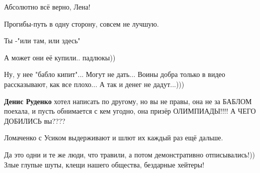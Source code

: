 \begin{itemize}
Абсолютно всё верно, Лена!

Прогибы-путь в одну сторону, совсем не лучшую.

Ты -"или там, или здесь"

 
А может они её купили.. падлюкы))

 
Ну, у нее "бабло кипит"... Могут не дать... Воины добра только в видео
рассказывают, как все плохо... А так и денег не дадут...)))

\begin{itemize}
 
\textbf{Денис Руденко} хотел написать по другому, но вы не правы, она не за БАБЛОМ поехала, и пусть обнимается с кем угодно, она призёр ОЛИМПИАДЫ!!!! А ЧЕГО ДОБИЛИСЬ вы????
\end{itemize}

 
Ломаченко с Усиком выдерживают и шлют их каждый раз ещё дальше.

 

Да это одни и те же люди, что травили, а потом демонстративно отписывались!))
Злые глупые шуты, клещи нашего общества, бездарные хейтеры!


 


\end{itemize}
